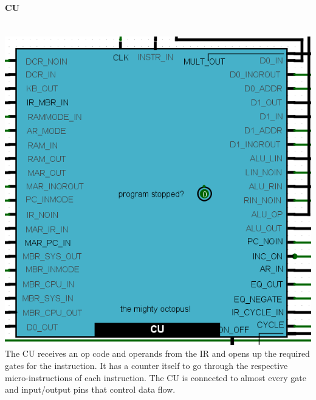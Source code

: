 \documentclass{article}
\begin{document}
	\paragraph{CU}~
	\\ \includegraphics[scale=0.5]{CU}\\The CU receives an op code and operands from the IR and opens up the required gates for the instruction. It has a counter itself to go through the respective micro-instructions of each instruction. The CU is connected to almost every gate and input/output pins that control data flow.
\end{document}
